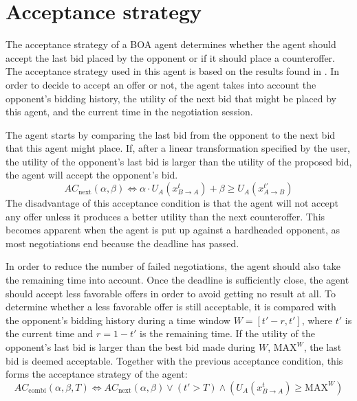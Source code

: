 \section{Acceptance strategy}

%
%
%

The acceptance strategy of a BOA agent determines whether the agent should accept the last bid placed by the opponent or if it should place a counteroffer.
The acceptance strategy used in this agent is based on the results found in \cite{ASarticle}.
In order to decide to accept an offer or not, the agent takes into account the opponent's bidding history, the utility of the next bid that might be placed by this agent, and the current time in the negotiation session.

The agent starts by comparing the last bid from the opponent to the next bid that this agent might place.
If, after a linear transformation specified by the user, the utility of the opponent's last bid is larger than the utility of the proposed bid, the agent will accept the opponent's bid.
$$
AC_\mathrm{next}(\alpha,\beta) \Leftrightarrow \alpha \cdot U_A(x^t_{B\rightarrow A}) + \beta \geq U_A(x^{t'}_{A\rightarrow B})
$$
The disadvantage of this acceptance condition is that the agent will not accept any offer unless it produces a better utility than the next counteroffer.
This becomes apparent when the agent is put up against a hardheaded opponent, as most negotiations end because the deadline has passed.

In order to reduce the number of failed negotiations, the agent should also take the remaining time into account.
Once the deadline is sufficiently close, the agent should accept less favorable offers in order to avoid getting no result at all.
To determine whether a less favorable offer is still acceptable, it is compared with the opponent's bidding history during a time window $W=[t'-r, t']$, where $t'$ is the current time and $r=1-t'$ is the remaining time.
If the utility of the opponent's last bid is larger than the best bid made during $W$, $\mathrm{MAX}^W$, the last bid is deemed acceptable.
Together with the previous acceptance condition, this forms the acceptance strategy of the agent:
$$
AC_\mathrm{combi}(\alpha,\beta,T) \Leftrightarrow AC_\mathrm{next}(\alpha,\beta) \vee (t' > T) \wedge ( U_A(x^t_{B\rightarrow A}) \geq \mathrm{MAX}^W)
$$
